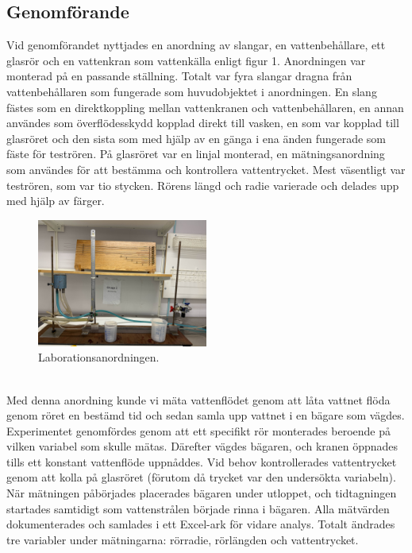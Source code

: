 \documentclass[a4paper,12pt]{article}
\begin{document}
\subsection{Genomförande}
    Vid genomförandet nyttjades en anordning av slangar, en vattenbehållare,
    ett glasrör och en vattenkran som vattenkälla enligt figur 1. Anordningen
    var monterad på en passande ställning. Totalt var fyra slangar dragna från
    vattenbehållaren som fungerade som huvudobjektet i anordningen. En slang
    fästes som en direktkoppling mellan vattenkranen och vattenbehållaren, en
    annan användes som överflödesskydd kopplad direkt till vasken, en som var
    kopplad till glasröret och den sista som med hjälp av en gänga i ena änden
    fungerade som fäste för teströren. På glasröret var en linjal monterad, en
    mätningsanordning som användes för att bestämma och kontrollera
    vattentrycket. Mest väsentligt var teströren, som var tio stycken. Rörens
    längd och radie varierade och delades upp med hjälp av färger. \\
    \begin{figure}[h]
        \centering
        \includegraphics[width=0.5\textwidth]{Labb-yta.jpg}
        \caption{Laborationsanordningen.}
        \label{fig:experiment_setup}
    \end{figure} \\
    Med denna anordning kunde vi mäta vattenflödet genom att låta vattnet flöda genom röret en bestämd tid och sedan samla upp vattnet i en bägare som vägdes.
    Experimentet genomfördes genom att ett specifikt rör monterades beroende på vilken variabel som skulle mätas. Därefter vägdes bägaren, och kranen öppnades tills ett konstant vattenflöde uppnåddes. Vid behov kontrollerades vattentrycket genom att kolla på glasröret (förutom då trycket var den undersökta variabeln).
    När mätningen påbörjades placerades bägaren under utloppet, och tidtagningen startades samtidigt som vattenstrålen började rinna i bägaren. Alla mätvärden dokumenterades och samlades i ett Excel-ark för vidare analys. Totalt ändrades tre variabler under mätningarna: rörradie, rörlängden och vattentrycket.
\end{document}
